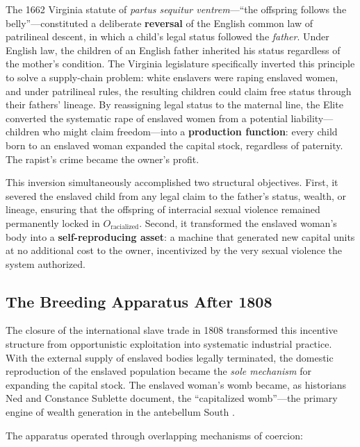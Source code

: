 The 1662 Virginia statute of \textit{partus sequitur ventrem}---``the offspring follows the belly''---constituted a deliberate \textbf{reversal} of the English common law of patrilineal descent, in which a child's legal status followed the \textit{father}. Under English law, the children of an English father inherited his status regardless of the mother's condition. The Virginia legislature specifically inverted this principle to solve a supply-chain problem: white enslavers were raping enslaved women, and under patrilineal rules, the resulting children could claim free status through their fathers' lineage. By reassigning legal status to the maternal line, the Elite converted the systematic rape of enslaved women from a potential liability---children who might claim freedom---into a \textbf{production function}: every child born to an enslaved woman expanded the capital stock, regardless of paternity. The rapist's crime became the owner's profit.

This inversion simultaneously accomplished two structural objectives. First, it severed the enslaved child from any legal claim to the father's status, wealth, or lineage, ensuring that the offspring of interracial sexual violence remained permanently locked in $O_{\text{racialized}}$. Second, it transformed the enslaved woman's body into a \textbf{self-reproducing asset}: a machine that generated new capital units at no additional cost to the owner, incentivized by the very sexual violence the system authorized.

\subsection{The Breeding Apparatus After 1808}

The closure of the international slave trade in 1808 transformed this incentive structure from opportunistic exploitation into systematic industrial practice. With the external supply of enslaved bodies legally terminated, the domestic reproduction of the enslaved population became the \textit{sole mechanism} for expanding the capital stock. The enslaved woman's womb became, as historians Ned and Constance Sublette document, the ``capitalized womb''---the primary engine of wealth generation in the antebellum South \cite{sublette}.

The apparatus operated through overlapping mechanisms of coercion:

